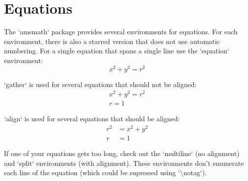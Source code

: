 \section{Equations}
The `amsmath` package provides several environments for equations.
For each environment, there is also a starred version that does not use automatic numbering.
For a single equation that spans a single line use the `equation` environment:
\begin{equation}
    \label{eq:circle}
    x^2 + y^2 = r^2
\end{equation}

`gather` is used for several equations that should not be aligned:
\begin{gather}
    x^2 + y^2 = r^2 \\
    r = 1
\end{gather}

`align` is used for several equations that should be aligned:
\begin{align}
    r^2 &= x^2 + y^2 \\
    r &= 1
\end{align}

If one of your equations gets too long, check out the `multiline` (no alignment) and `split` environments (with alignment).
These environments don't enumerate each line of the equation (which could be supressed using `\textbackslash notag`).

